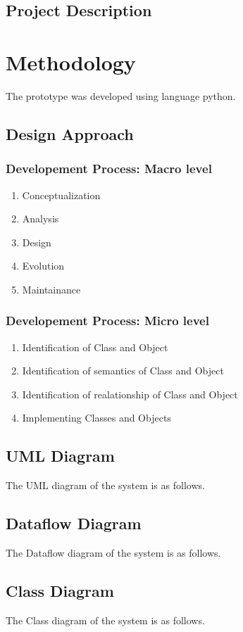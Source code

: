 \documentclass[a4paper,12pt,onepage]{article}
\begin{document}
	\subsection{Project Description}
	\newpage
\section{Methodology}
The prototype was developed using language python.
\subsection{Design Approach}
\subsubsection{Developement Process: Macro level}
\begin{enumerate}
\item Conceptualization
\newpage
\item Analysis
\newpage
\item Design
\newpage
\item Evolution
\newpage
\item Maintainance
\newpage
\end{enumerate}
\subsubsection{Developement Process: Micro level}
\begin{enumerate}
\item Identification of Class and Object
\newpage
\item Identification of semantics of Class and Object
\newpage
\item Identification of realationship of Class and Object
\newpage
\item Implementing Classes and Objects
\newpage
\end{enumerate}
\subsection{UML Diagram}
The UML diagram of the system is as follows.

\newpage
\subsection{Dataflow Diagram}
The Dataflow diagram of the system is as follows.

\newpage
\subsection{Class Diagram}\par
The Class diagram of the system is as follows.
\end{document}
